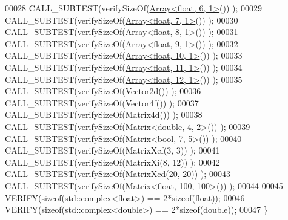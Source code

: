 \begin{DoxyCode}
00028   CALL\_SUBTEST(verifySizeOf(\hyperlink{group___core___module_class_eigen_1_1_array}{Array<float, 6, 1>}()) );
00029   CALL\_SUBTEST(verifySizeOf(\hyperlink{group___core___module_class_eigen_1_1_array}{Array<float, 7, 1>}()) );
00030   CALL\_SUBTEST(verifySizeOf(\hyperlink{group___core___module_class_eigen_1_1_array}{Array<float, 8, 1>}()) );
00031   CALL\_SUBTEST(verifySizeOf(\hyperlink{group___core___module_class_eigen_1_1_array}{Array<float, 9, 1>}()) );
00032   CALL\_SUBTEST(verifySizeOf(\hyperlink{group___core___module_class_eigen_1_1_array}{Array<float, 10, 1>}()) );
00033   CALL\_SUBTEST(verifySizeOf(\hyperlink{group___core___module_class_eigen_1_1_array}{Array<float, 11, 1>}()) );
00034   CALL\_SUBTEST(verifySizeOf(\hyperlink{group___core___module_class_eigen_1_1_array}{Array<float, 12, 1>}()) );
00035   CALL\_SUBTEST(verifySizeOf(Vector2d()) );
00036   CALL\_SUBTEST(verifySizeOf(Vector4f()) );
00037   CALL\_SUBTEST(verifySizeOf(Matrix4d()) );
00038   CALL\_SUBTEST(verifySizeOf(\hyperlink{group___core___module_class_eigen_1_1_matrix}{Matrix<double, 4, 2>}()) );
00039   CALL\_SUBTEST(verifySizeOf(\hyperlink{group___core___module_class_eigen_1_1_matrix}{Matrix<bool, 7, 5>}()) );
00040   CALL\_SUBTEST(verifySizeOf(MatrixXcf(3, 3)) );
00041   CALL\_SUBTEST(verifySizeOf(MatrixXi(8, 12)) );
00042   CALL\_SUBTEST(verifySizeOf(MatrixXcd(20, 20)) );
00043   CALL\_SUBTEST(verifySizeOf(\hyperlink{group___core___module_class_eigen_1_1_matrix}{Matrix<float, 100, 100>}()) );
00044   
00045   VERIFY(\textcolor{keyword}{sizeof}(std::complex<float>) == 2*\textcolor{keyword}{sizeof}(\textcolor{keywordtype}{float}));
00046   VERIFY(\textcolor{keyword}{sizeof}(std::complex<double>) == 2*\textcolor{keyword}{sizeof}(\textcolor{keywordtype}{double}));
00047 \}
\end{DoxyCode}

